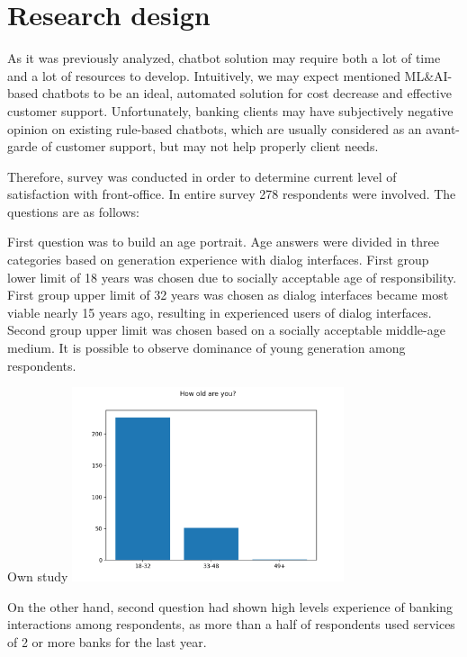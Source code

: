 
\section{Research design}

As it was previously analyzed, chatbot solution may require both a lot of time and a lot of resources to develop.
Intuitively, we may expect mentioned ML\&AI-based chatbots to be an ideal, automated solution for cost decrease and effective customer support.
Unfortunately, banking clients may have subjectively negative opinion on existing rule-based chatbots, which are usually considered as an avant-garde of customer support, but may not help properly client needs.

Therefore, survey was conducted in order to determine current level of satisfaction with front-office.
In entire survey 278 respondents were involved.
The questions are as follows:



First question was to build an age portrait. 
Age answers were divided in three categories based on generation experience with dialog interfaces.
First group lower limit of 18 years was chosen due to socially acceptable age of responsibility.
First group upper limit of 32 years was chosen as dialog interfaces became most viable nearly 15 years ago, resulting in experienced users of dialog interfaces.
Second group upper limit was chosen based on a socially acceptable middle-age medium. 
It is possible to observe dominance of young generation among respondents.

{Own study}
{
    \includegraphics[width=0.6\textwidth,height=\textheight,keepaspectratio]{survey/1_how_old_are_you.png}
}

On the other hand, second question had shown high levels experience of banking interactions among respondents, as more than a half of respondents used services of 2 or more banks for the last year.

